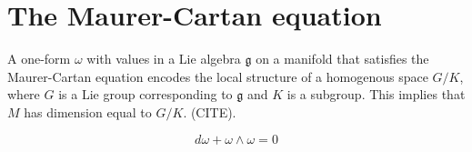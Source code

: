 \documentclass{amsart}
\newcommand{\g}{\mathfrak{g}}
\begin{document}
\section{The Maurer-Cartan equation}

A one-form $\omega$ with values in a Lie algebra $\g$ on a manifold that satisfies the Maurer-Cartan equation encodes the local structure of a homogenous space $G/K$, where $G$ is a Lie group corresponding to $\g$ and $K$ is a subgroup.
This implies that $M$ has dimension equal to $G/K$. (CITE).

$$ d \omega + \omega \wedge \omega = 0 $$
\end{document}
